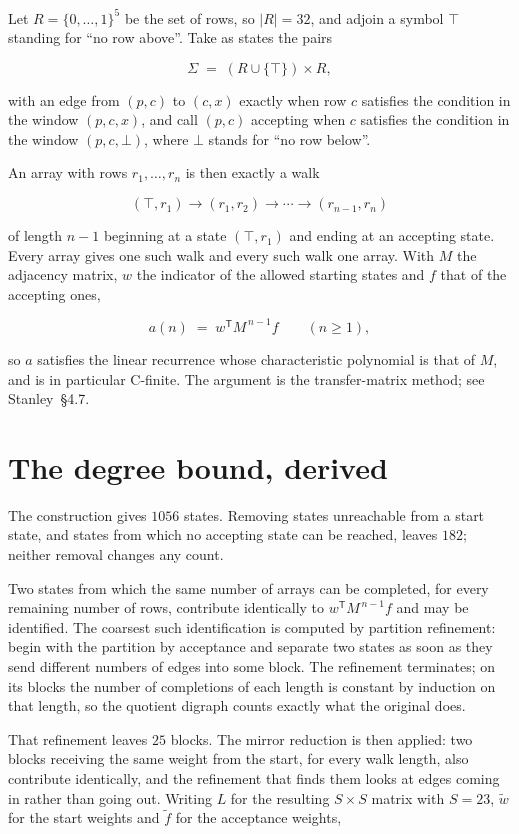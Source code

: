 \documentclass[11pt]{article}
\theoremstyle{definition}
\begin{document}
Let $R = \{0,\dots,1\}^{5}$ be the set of rows, so $|R| = 32$, and adjoin a symbol $\top$ standing for ``no row above''. Take as states the pairs

\[\Sigma \;=\; (R \cup \{\top\}) \times R,\]

with an edge from $(p,c)$ to $(c,x)$ exactly when row $c$ satisfies the condition in the window $(p,c,x)$, and call $(p,c)$ accepting when $c$ satisfies the condition in the window $(p,c,\bot)$, where $\bot$ stands for ``no row below''.

An array with rows $r_1,\dots,r_n$ is then exactly a walk

\[(\top,r_1) \to (r_1,r_2) \to \cdots \to (r_{n-1},r_n)\]

of length $n-1$ beginning at a state $(\top,r_1)$ and ending at an accepting state. Every array gives one such walk and every such walk one array. With $M$ the adjacency matrix, $w$ the indicator of the allowed starting states and $f$ that of the accepting ones,

\[a(n) \;=\; w^{\mathsf T} M^{\,n-1} f \qquad (n \ge 1),\]

so $a$ satisfies the linear recurrence whose characteristic polynomial is that of $M$, and is in particular C-finite. The argument is the transfer-matrix method; see Stanley~\S4.7.

\section{The degree bound, derived}

The construction gives $1056$ states. Removing states unreachable from a start state, and states from which no accepting state can be reached, leaves $182$; neither removal changes any count.

Two states from which the same number of arrays can be completed, for every remaining number of rows, contribute identically to $w^{\mathsf T}M^{\,n-1}f$ and may be identified. The coarsest such identification is computed by partition refinement: begin with the partition by acceptance and separate two states as soon as they send different numbers of edges into some block. The refinement terminates; on its blocks the number of completions of each length is constant by induction on that length, so the quotient digraph counts exactly what the original does.

That refinement leaves $25$ blocks. The mirror reduction is then applied: two blocks receiving the same weight from the start, for every walk length, also contribute identically, and the refinement that finds them looks at edges coming in rather than going out. Writing $L$ for the resulting $S \times S$ matrix with $S = 23$, $\tilde w$ for the start weights and $\tilde f$ for the acceptance weights,
\end{document}
